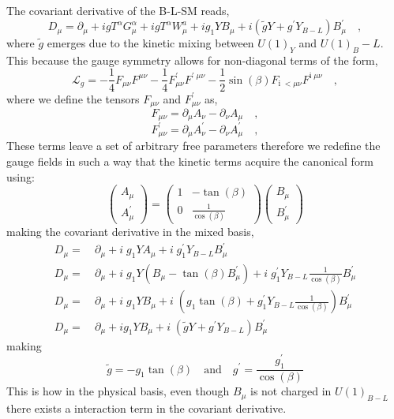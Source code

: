 \documentclass[12pt]{article}
\begin{document}
The covariant derivative of the B-L-SM reads,
%
\begin{equation}
D_\mu = \partial_\mu + igT^\alpha G^\alpha_\mu + igT^\alpha W^a_\mu + ig_1YB_\mu + i(\tilde{g} Y +g^\prime Y_{B-L})B^\prime_\mu \quad ,
\end{equation}
%
where $\tilde{g}$ emerges due to the kinetic mixing between $U(1)_Y$ and $U(1)_B-L$. This because the gauge symmetry allows for non-diagonal terms of the form, 
\begin{equation}
\mathcal{L}_{g}=-\frac{1}{4} F_{\mu \nu} F^{\mu \nu } -\frac{1}{4} F^\prime_{\mu \nu} F^{\prime \;\mu \nu} - \frac{1}{2} \sin(\beta)   F_{\text{i} \;< \mu \nu} F^{\text{i} \; \mu \nu } \quad , 
\end{equation}
where we define the tensors $F_{\mu \nu} $ and  $F_{\mu \nu}^\prime$ as, 
\begin{equation}
F_{\mu \nu} = \partial_\mu A_\nu - \partial_\nu A_\mu \quad , 
\end{equation}
\begin{equation}
F^\prime_{\mu \nu} = \partial_\mu A^\prime_\nu - \partial_\nu A^\prime_\mu  \quad , 
\end{equation}
%
These terms leave a set of arbitrary free parameters therefore we redefine the gauge fields in such a way that the kinetic terms acquire the canonical form using: 
%
\begin{equation}
\begin{pmatrix}
A_\mu  \\
A_\mu^\prime
\end{pmatrix}=
\begin{pmatrix}
1 & - \tan(\beta) \\
0 & \frac{1}{\cos(\beta)}
\end{pmatrix}
\begin{pmatrix}
B_\mu \\
B_\mu^\prime
\end{pmatrix}
\end{equation}
 making the covariant derivative in the mixed basis, 
 \begin{align}
  D_\mu = \ & \partial_\mu + i \; g_1 Y A_\mu + i \; g^\prime_1 Y_{B-L} B_\mu^\prime  \nonumber \\   D_\mu = \ & \nonumber   \partial_\mu + i \; g_1 Y (B_\mu - \tan(\beta) B_\mu^\prime) + i \; g_1^\prime  Y_{B-L} \frac{1}{\cos(\beta)} B_\mu^\prime  \\
   D_\mu = \ &   \partial_\mu + i \; g_1 Y B_\mu + i \; (  g_1 \tan(\beta) + g^\prime_1 Y_{B-L} \frac{1}{\cos(\beta)}  ) B_\mu^\prime \nonumber \\
   D_\mu =  \ & \partial_\mu + i g_1 Y B_\mu + i \; (\tilde{g} Y + g^\prime Y_{B-L}) B_\mu^\prime 
 \end{align}
 making 
 \begin{equation}
 \tilde{g} = -g_1 \tan(\beta) \quad \text{and} \quad g^\prime = \frac{g^\prime_1}{\cos(\beta)}
 \end{equation}
This is how in the physical basis, even though $B_\mu$ is not charged in $U(1)_{B-L}$ there exists a interaction term in the covariant derivative. 	
\end{document}
